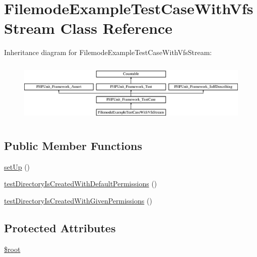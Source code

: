 \hypertarget{classorg_1_1bovigo_1_1vfs_1_1example_1_1_filemode_example_test_case_with_vfs_stream}{}\section{Filemode\+Example\+Test\+Case\+With\+Vfs\+Stream Class Reference}
\label{classorg_1_1bovigo_1_1vfs_1_1example_1_1_filemode_example_test_case_with_vfs_stream}
Inheritance diagram for Filemode\+Example\+Test\+Case\+With\+Vfs\+Stream\+:\begin{figure}[H]
\begin{center}
\leavevmode
\includegraphics[height=2.962963cm]{classorg_1_1bovigo_1_1vfs_1_1example_1_1_filemode_example_test_case_with_vfs_stream}
\end{center}
\end{figure}
\subsection*{Public Member Functions}
\begin{DoxyCompactItemize}
\item 
\mbox{\hyperlink{classorg_1_1bovigo_1_1vfs_1_1example_1_1_filemode_example_test_case_with_vfs_stream_a0bc688732d2b3b162ffebaf7812e78da}{set\+Up}} ()
\item 
\mbox{\hyperlink{classorg_1_1bovigo_1_1vfs_1_1example_1_1_filemode_example_test_case_with_vfs_stream_a7b5dbf2df70798384821f0fd3084be2e}{test\+Directory\+Is\+Created\+With\+Default\+Permissions}} ()
\item 
\mbox{\hyperlink{classorg_1_1bovigo_1_1vfs_1_1example_1_1_filemode_example_test_case_with_vfs_stream_a3271ee1b77079c481daefd164082dbba}{test\+Directory\+Is\+Created\+With\+Given\+Permissions}} ()
\end{DoxyCompactItemize}
\subsection*{Protected Attributes}
\begin{DoxyCompactItemize}
\item 
\mbox{\hyperlink{classorg_1_1bovigo_1_1vfs_1_1example_1_1_filemode_example_test_case_with_vfs_stream_ab37f7c32f41c3c61ed940887453767f4}{\$root}}
\end{DoxyCompactItemize}
